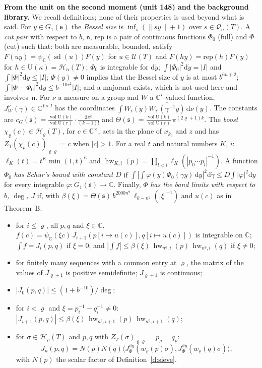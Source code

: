 \documentclass[11pt,a4paper]{article}
\newcommand{\subhead}[1]{\par\addvspace{9pt plus 2pt}\Needspace{4\baselineskip}\noindent\textbf{#1}\enspace\ignorespaces}
\theoremstyle{plainx}
\theoremstyle{uprightx}
\newcommand{\CC}{\mathbb{C}}
\newcommand{\dd}{\mathrm{d}}
\newcommand{\Hl}[2]{\mathcal{H}_{#1}(#2)}
\newcommand{\Ql}[2]{\mathcal{Q}_{#1}(#2)}
\newcommand{\UT}[1]{\mathcal{U}(#1)}
\newcommand{\ZT}[2]{Z_{#1}(#2)}
\newcommand{\sd}{\operatorname{sd}}
\newcommand{\wl}[2]{w_{#1}(#2)}
\newcommand{\ip}[2]{\langle #1,#2\rangle}
\newcommand{\vol}{\operatorname{vol}}
\newcommand{\Gone}[1]{G_1(#1)}
\newcommand{\volU}[1]{\vol\mathrm{U}(#1)}
\newcommand{\hw}[3]{\operatorname{hw}_{#1,#2}(#3)}
\newcommand{\damp}[2]{\ell_{#1}(#2)}
\newcommand{\bandc}[1]{\Theta(#1)}
\newcommand{\cellc}[1]{c_G(#1)}
\newcommand{\corr}[3]{J^{#1}_{#2}(#3)}
\newcommand{\boost}[2]{\chi_{#1}(#2)}
\begin{document}
\subhead{From the unit on the second moment (unit 148) and the background library.} We recall definitions; none of
their properties is used beyond what is said. For $y\in\Gone{\mathfrak{s}}$ the \emph{Bessel size} is
$\inf_s(\|sy\|+1)$ over $s\in\Ql{n}{T}$. A \emph{cut pair} with respect to $b$, $\mathsf{n}$, $\mathrm{rep}$ is a pair
of continuous functions $\Phi_0$ (full) and $\Phi$ (cut) such that: both are measurable, bounded, satisfy
$F(uy)=\psi_{\CC}(\sd(u))F(y)$ for $u\in\UT{T}$ and $F(hy)=\mathrm{rep}(h)F(y)$ for $h\in\mathrm{U}(\kappa)=\Hl{n}{T}$;
$\Phi_0$ is integrable for $\dd\dot y$; $\int|\Phi_0|^2\dd\dot y=|I|$ and $\int|\Phi|^2\dd\dot y\le|I|$; $\Phi(y)\ne0$
implies that the Bessel size of $y$ is at most $b^{6n+2}$; $\int|\Phi-\Phi_0|^2\dd\dot y\le b^{-10r^2}|I|$; and a
majorant exists, which is not used here and involves~$\mathsf{n}$. For $\nu$ a measure on a group and $W$ a
$\CC^I$-valued function, $\corr{\nu}{W}{\gamma}\in\CC^{I\times I}$ has the coordinates
$\int W_i(y)\overline{W_{i'}(\gamma^{-1}y)}\,\dd\nu(y)$. The constants are
$\cellc{\mathfrak{s}}=\frac{\volU{k}}{\volU{r}}\cdot\frac{2\pi^{k}}{(k-1)!}$ and
$\bandc{\mathfrak{s}}=\frac{\volU{k}}{\volU{r}}\,\pi^{(2\varrho+1)k}$. The \emph{boost} $\boost{\varrho}{c}\in\Hl{\varrho}{T}$,
for $c\in\CC^{\times}$, acts in the plane of $x_{k_0}$ and $z$ and has $\ZT{T}{\boost{\varrho}{c}}_{\varrho\varrho}=c$
when $|c|>1$. For a real $t$ and natural numbers $K$, $i$: $\damp{K}{t}=t^{K}\min(1,t)^{6}$ and
$\hw{K}{i}{p}=\prod_{l<i}\damp{K}{|p_0\cdots p_l|^{-1}}$. A function $\Phi_0$ \emph{has Schur's bound with constant
$D$} if $\int|\int\varphi(y)\Phi_0(\gamma y)\,\dd y|^{2}\dd\dot\gamma\le D\int|\varphi|^2\dd y$ for every integrable
$\varphi\colon\Gone{\mathfrak{s}}\to\CC$. Finally, $\Phi$ \emph{has the band limits with respect to $b$, $\deg$, $J$}
if, with $\beta(\xi)=\bandc{\mathfrak{s}}\,b^{2000n^{9}}\,\damp{k-n^{7}}{|\xi|^{-1}}$ and $u(c)$ as in Theorem~B:
\begin{itemize}
\item[(S1)] for $i\le\varrho$, all $p,q$ and $\xi\in\CC$, $f(c)=\psi_{\CC}(\xi c)\,J_{i+1}(p[i\mapsto u(c)],q[i\mapsto u(c)])$
  is integrable on $\CC$; $\int f=J_i(p,q)$ if $\xi=0$; and
  $|\int f|\le\beta(\xi)\,\hw{n^6}{i}{p}\,\hw{n^6}{i}{q}$ if $\xi\ne0$;
\item[(S2)] for finitely many sequences with a common entry at $\varrho$, the matrix of the values of $J_{\varrho+1}$
  is positive semidefinite; $J_{\varrho+1}$ is continuous;
\item[(S3)] $|J_0(p,q)|\le(1+b^{-10})/\deg$;
\item[(S4)] for $i<\varrho$ and $\xi=p_i^{-1}-q_i^{-1}\ne0$:
  $|J_{i+1}(p,q)|\le\beta(\xi)\,\hw{n^6}{i+1}{p}\,\hw{n^6}{i+1}{q}$;
\item[(S5)] for $\sigma\in\Hl{\varrho}{T}$ and $p,q$ with $\ZT{T}{\sigma}_{\varrho\varrho}=p_\varrho=q_\varrho$:
  \[J_{n}(p,q)=N(p)N(q)\ip{\corr{\dd y}{\Phi}{\wl{\varrho}{p}\sigma}}{\corr{\dd y}{\Phi}{\wl{\varrho}{q}\sigma}},\]
  with $N(p)$ the scalar factor of Definition~\ref{d:sieve}.
\end{itemize}
\end{document}
